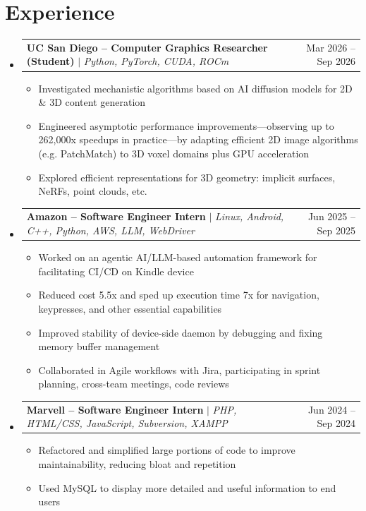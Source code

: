 \documentclass[letterpaper,11pt]{article}
\makeatletter
\newcommand{\resumeItem}[1]{
  \item\small{
    {#1 \vspace{-2pt}}
  }
}
\newcommand{\resumeProjectHeading}[2]{
    \item
    \begin{tabular*}{0.97\textwidth}{l@{\extracolsep{\fill}}r}
      \small#1 & #2 \\
    \end{tabular*}\vspace{-7pt}
}
\newcommand{\resumeSubHeadingListStart}{\begin{itemize}[leftmargin=0.15in, label={}]}
\newcommand{\resumeSubHeadingListEnd}{\end{itemize}}
\newcommand{\resumeItemListStart}{\begin{itemize}}
\newcommand{\resumeItemListEnd}{\end{itemize}\vspace{-5pt}}
\makeatother
\begin{document}
\section{Experience}
    \resumeSubHeadingListStart
        \resumeProjectHeading
            {\textbf{UC San Diego -- Computer Graphics Researcher (Student)} $\mid$ \emph{Python, PyTorch, CUDA, ROCm}}{Mar 2026 -- Sep 2026}
            \resumeItemListStart
                \resumeItem{Investigated mechanistic algorithms based on AI diffusion models for 2D \& 3D content generation}
                \resumeItem{Engineered asymptotic performance improvements---observing up to 262,000x speedups in practice---by adapting efficient 2D image algorithms (e.g. PatchMatch) to 3D voxel domains plus GPU acceleration}
                \resumeItem{Explored efficient representations for 3D geometry: implicit surfaces, NeRFs, point clouds, etc.}
            \resumeItemListEnd
        \resumeProjectHeading
            {\textbf{Amazon -- Software Engineer Intern} $\mid$ \emph{Linux, Android, C++, Python, AWS, LLM, WebDriver}}{Jun 2025 -- Sep 2025}
            \resumeItemListStart
                \resumeItem{Worked on an agentic AI/LLM-based automation framework for facilitating CI/CD on Kindle device}
                \resumeItem{Reduced cost 5.5x and sped up execution time 7x for navigation, keypresses, and other essential capabilities}
                \resumeItem{Improved stability of device-side daemon by debugging and fixing memory buffer management}
                \resumeItem{Collaborated in Agile workflows with Jira, participating in sprint planning, cross-team meetings, code reviews}
            \resumeItemListEnd
        \resumeProjectHeading
            {\textbf{Marvell -- Software Engineer Intern} $\mid$ \emph{PHP, HTML/CSS, JavaScript, Subversion, XAMPP}}{Jun 2024 -- Sep 2024}
            \resumeItemListStart
                \resumeItem{Refactored and simplified large portions of code to improve maintainability, reducing bloat and repetition}
                \resumeItem{Used MySQL to display more detailed and useful information to end users}
            \resumeItemListEnd
    \resumeSubHeadingListEnd
\end{document}
